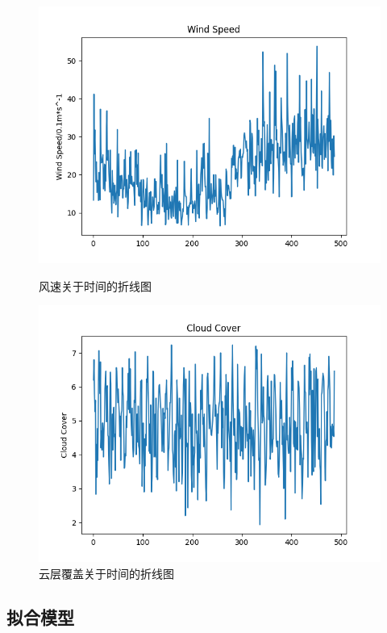 \documentclass[UTF8, a4paper]{ctexart}
\begin{document}
\begin{figure}[h!]
	\centering
	\begin{minipage}[h!]{0.4\textwidth}
		\centering
		\includegraphics[scale=0.3]{fg.png}
		\caption{风速关于时间的折线图}
	\end{minipage}
	\begin{minipage}[h!]{0.4\textwidth}
		\centering
		\includegraphics[scale=0.3]{cc.png}
		\caption{云层覆盖关于时间的折线图}
	\end{minipage}
\end{figure}

\subsection{拟合模型}
\end{document}

